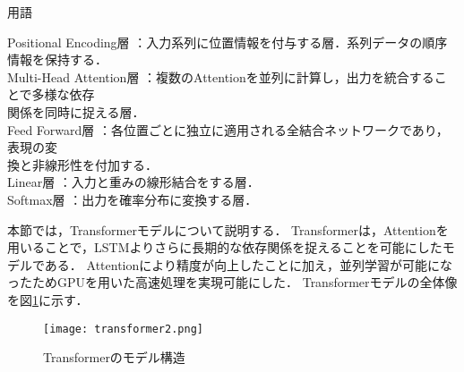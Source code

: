 \documentclass[dvipdfmx]{jreport}
\begin{document}
\begin{itembox}[l]{\large{用語}}
\begin{tabbing}
        \hspace{15pt} \raisebox{0.5ex}{\tiny $\bullet$} Positional Encoding層 \>：入力系列に位置情報を付与する層．系列データの順序情報を保持する．\\[0.5em]
        \hspace{15pt} \raisebox{0.5ex}{\tiny $\bullet$} Multi-Head Attention層 \>：複数のAttentionを並列に計算し，出力を統合することで多様な依存\\[0.5em]\>\hspace{6.5pt}関係を同時に捉える層．\\[0.5em]
        \hspace{15pt} \raisebox{0.5ex}{\tiny $\bullet$} Feed Forward層 \>：各位置ごとに独立に適用される全結合ネットワークであり，表現の変\\[0.5em]\>\hspace{6.5pt}換と非線形性を付加する．\\[0.5em]
        \hspace{15pt} \raisebox{0.5ex}{\tiny $\bullet$} Linear層 \>：入力と重みの線形結合をする層．\\[0.5em]
        \hspace{15pt} \raisebox{0.5ex}{\tiny $\bullet$} Softmax層 \>：出力を確率分布に変換する層．
    \end{tabbing}
\end{itembox}

本節では，Transformerモデルについて説明する．
Transformerは，Attentionを用いることで，LSTMよりさらに長期的な依存関係を捉えることを可能にしたモデルである．
Attentionにより精度が向上したことに加え，並列学習が可能になったためGPUを用いた高速処理を実現可能にした．
Transformerモデルの全体像を図\ref{fig:transformer}に示す．

\begin{figure}[h]
    \begin{center}
        \texttt{[image: transformer2.png]} 
        \caption{Transformerのモデル構造} \label{fig:transformer}
    \end{center}
\end{figure}
\newpage
\end{document}
